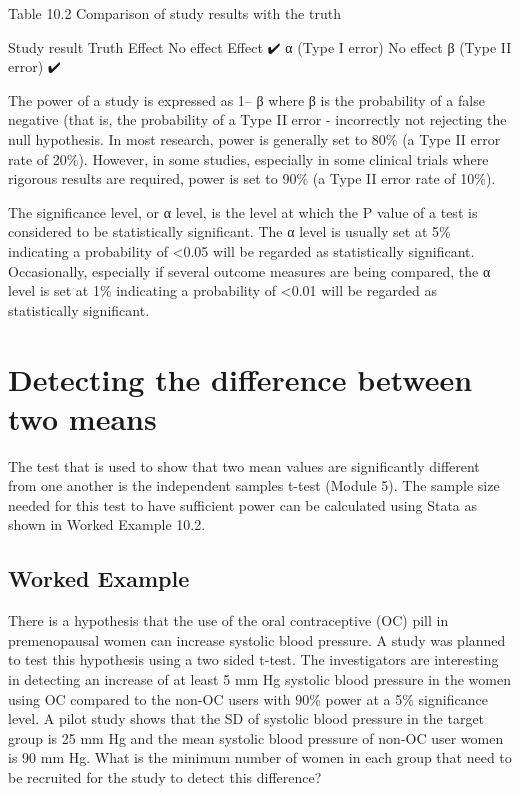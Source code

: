 \documentclass[
]{memoir}
\begin{document}
Table 10.2 Comparison of study results with the truth

Study result Truth
Effect No effect
Effect ✔️ α (Type I error)
No effect β (Type II error) ✔️

The power of a study is expressed as 1-- β where β is the probability of a false negative (that is, the probability of a Type II error - incorrectly not rejecting the null hypothesis. In most research, power is generally set to 80\% (a Type II error rate of 20\%). However, in some studies, especially in some clinical trials where rigorous results are required, power is set to 90\% (a Type II error rate of 10\%).

The significance level, or α level, is the level at which the P value of a test is considered to be statistically significant. The α level is usually set at 5\% indicating a probability of \textless0.05 will be regarded as statistically significant. Occasionally, especially if several outcome measures are being compared, the α level is set at 1\% indicating a probability of \textless0.01 will be regarded as statistically significant.

\hypertarget{detecting-the-difference-between-two-means}{%
\section{Detecting the difference between two means}\label{detecting-the-difference-between-two-means}}

The test that is used to show that two mean values are significantly different from one another is the independent samples t-test (Module 5). The sample size needed for this test to have sufficient power can be calculated using Stata as shown in Worked Example 10.2.

\hypertarget{worked-example-15}{%
\subsection{Worked Example}\label{worked-example-15}}

There is a hypothesis that the use of the oral contraceptive (OC) pill in premenopausal women can increase systolic blood pressure. A study was planned to test this hypothesis using a two sided t-test. The investigators are interesting in detecting an increase of at least 5 mm Hg systolic blood pressure in the women using OC compared to the non-OC users with 90\% power at a 5\% significance level. A pilot study shows that the SD of systolic blood pressure in the target group is 25 mm Hg and the mean systolic blood pressure of non-OC user women is 90 mm Hg. What is the minimum number of women in each group that need to be recruited for the study to detect this difference?
\end{document}
